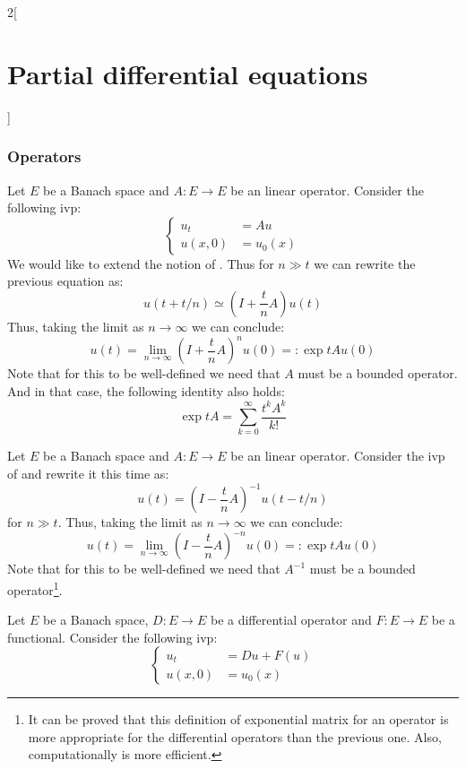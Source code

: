 \documentclass[../../../main_math.tex]{subfiles}
\begin{document}
\begin{multicols}{2}[\section{Partial differential equations}]
  \subsubsection{Operators}
  \begin{definition}
    Let $E$ be a Banach space and $A:E\rightarrow E$ be an linear operator. Consider the following ivp:
    \begin{equation}\label{PDE:operatorpde}
      \left\{
      \begin{aligned}
        u_{t}  & =A u    \\
        u(x,0) & =u_0(x)
      \end{aligned}
      \right.
    \end{equation}
    We would like to extend the notion of . Thus for $n\gg t$ we can rewrite the previous equation as:
    $$u(t +t/n)\simeq \left(I+\frac{t}{n}A\right)u(t)$$
    Thus, taking the limit as $n\to \infty$ we can conclude: $$u(t)=\lim_{n\to\infty}{\left(I+\frac{t}{n}A\right)}^nu(0)=:\exp{tA}u(0)$$
    Note that for this to be well-defined we need that $A$ must be a bounded operator. And in that case, the following identity also holds: $$\exp{tA}=\sum_{k=0}^\infty\frac{t^kA^k}{k!}$$
  \end{definition}
  \begin{definition}
    Let $E$ be a Banach space and $A:E\rightarrow E$ be an linear operator. Consider the ivp of  and rewrite it this time as:
    $$ u(t)= {\left(I-\frac{t}{n}A\right)}^{-1}u(t-t/n)$$
    for $n\gg t$.
    Thus, taking the limit as $n\to \infty$ we can conclude: $$u(t)=\lim_{n\to\infty}{\left(I-\frac{t}{n}A\right)}^{-n}u(0)=:\exp{tA}u(0)$$
    Note that for this to be well-defined we need that $A^{-1}$ must be a bounded operator\footnote{It can be proved that this definition of exponential matrix for an operator is more appropriate for the differential operators than the previous one. Also, computationally is more efficient.}.
  \end{definition}
  \begin{proposition}
    Let $E$ be a Banach space, $D:E\rightarrow E$ be a differential operator and $F:E\rightarrow E$ be a functional. Consider the following ivp:
    \begin{equation}
      \left\{
      \begin{aligned}
        u_{t}  & =D u +F(u) \\
        u(x,0) & =u_0(x)
      \end{aligned}

\end{equation}
\end{proposition}
\end{multicols}
\end{document}
